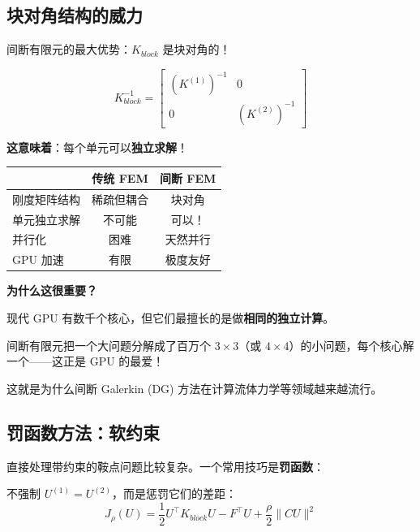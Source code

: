 \subsection{块对角结构的威力}

间断有限元的最大优势：$K_{block}$ 是块对角的！

\begin{equation}
K_{block}^{-1} = \begin{bmatrix}
(K^{(1)})^{-1} & 0 \\
0 & (K^{(2)})^{-1}
\end{bmatrix}
\end{equation}

\textbf{这意味着}：每个单元可以\textbf{独立求解}！

\begin{center}
\renewcommand{\arraystretch}{1.4}
\begin{tabular}{l|c|c}
\toprule
& \textbf{传统 FEM} & \textbf{间断 FEM} \\
\midrule
刚度矩阵结构 & 稀疏但耦合 & 块对角 \\
单元独立求解 & 不可能 & 可以！ \\
并行化 & 困难 & 天然并行 \\
GPU 加速 & 有限 & 极度友好 \\
\bottomrule
\end{tabular}
\end{center}

\begin{insightbox}
\textbf{为什么这很重要？}

现代 GPU 有数千个核心，但它们最擅长的是做\textbf{相同的独立计算}。

间断有限元把一个大问题分解成了百万个 $3 \times 3$（或 $4 \times 4$）的小问题，每个核心解一个——这正是 GPU 的最爱！

这就是为什么间断 Galerkin (DG) 方法在计算流体力学等领域越来越流行。
\end{insightbox}

\subsection{罚函数方法：软约束}

直接处理带约束的鞍点问题比较复杂。一个常用技巧是\textbf{罚函数}：

不强制 $U^{(1)} = U^{(2)}$，而是惩罚它们的差距：
\begin{equation}
J_\rho(U) = \frac{1}{2}U^\top K_{block} U - F^\top U + \frac{\rho}{2}\|CU\|^2
\end{equation}

